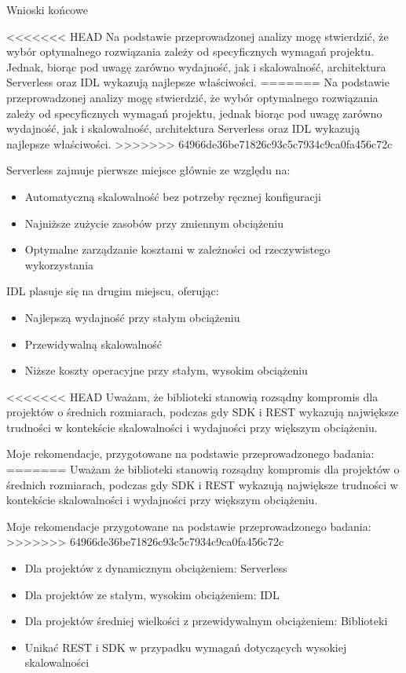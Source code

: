 \documentclass[runningheads,12pt]{llncs}
\begin{document}
Wnioski końcowe

<<<<<<< HEAD
Na podstawie przeprowadzonej analizy mogę stwierdzić, że wybór optymalnego rozwiązania zależy od specyficznych wymagań projektu. Jednak, biorąc pod uwagę zarówno wydajność, jak i skalowalność, architektura Serverless oraz IDL wykazują najlepsze właściwości.
=======
Na podstawie przeprowadzonej analizy mogę stwierdzić, że wybór optymalnego rozwiązania zależy od specyficznych wymagań projektu, jednak biorąc pod uwagę zarówno wydajność, jak i skalowalność, architektura Serverless oraz IDL wykazują najlepsze właściwości.
>>>>>>> 64966de36be71826c93c5c7934c9ca0fa456c72c

Serverless zajmuje pierwsze miejsce głównie ze względu na:
\begin{itemize}
    \item Automatyczną skalowalność bez potrzeby ręcznej konfiguracji
    \item Najniższe zużycie zasobów przy zmiennym obciążeniu
    \item Optymalne zarządzanie kosztami w zależności od rzeczywistego wykorzystania
\end{itemize}

IDL plasuje się na drugim miejscu, oferując:
\begin{itemize}
    \item Najlepszą wydajność przy stałym obciążeniu
    \item Przewidywalną skalowalność
    \item Niższe koszty operacyjne przy stałym, wysokim obciążeniu
\end{itemize}

<<<<<<< HEAD
Uważam, że biblioteki stanowią rozsądny kompromis dla projektów o średnich rozmiarach, podczas gdy SDK i REST wykazują największe trudności w kontekście skalowalności i wydajności przy większym obciążeniu.

Moje rekomendacje, przygotowane na podstawie przeprowadzonego badania:
=======
Uważam że biblioteki stanowią rozsądny kompromis dla projektów o średnich rozmiarach, podczas gdy SDK i REST wykazują największe trudności w kontekście skalowalności i wydajności przy większym obciążeniu.

Moje rekomendacje przygotowane na podstawie przeprowadzonego badania:
>>>>>>> 64966de36be71826c93c5c7934c9ca0fa456c72c

\begin{itemize}
    \item Dla projektów z dynamicznym obciążeniem: Serverless
    \item Dla projektów ze stałym, wysokim obciążeniem: IDL
    \item Dla projektów średniej wielkości z przewidywalnym obciążeniem: Biblioteki
    \item Unikać REST i SDK w przypadku wymagań dotyczących wysokiej skalowalności
\end{itemize}
\end{document}
